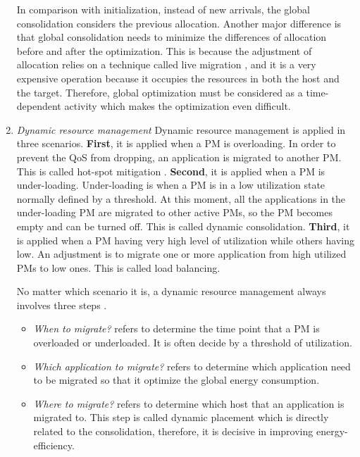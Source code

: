 \begin{enumerate}
	In comparison with initialization, instead of new arrivals, the global consolidation considers the previous allocation. Another major difference is that global consolidation needs to minimize the differences of allocation before and after the optimization. This is because the adjustment of allocation relies on a technique called live migration \cite{Clark:2005uda}, and it is a very expensive operation because it occupies the resources in both the host and the target. Therefore, global optimization must be considered as a time-dependent activity which makes the optimization even difficult.

	\item \emph{Dynamic resource management} 
 	Dynamic resource management is applied in three scenarios. \textbf{First},  it is applied when a PM is overloading. In order to prevent the QoS from dropping, an application is migrated to another PM. This is called hot-spot mitigation \cite{Mishra:2012kx}. \textbf{Second}, it is applied when a PM is under-loading. Under-loading is when a PM is in a low utilization state normally defined by a threshold. At this moment, all the applications in the under-loading PM are migrated to other active PMs, so the PM becomes empty and can be turned off. This is called dynamic consolidation. \textbf{Third}, it is applied when a PM having very high level of utilization while others having low. An adjustment is to migrate one or more application from high utilized PMs to low ones. This is called load balancing.

	No matter which scenario it is, a dynamic resource management always involves three steps . 
	\begin{itemize}
		\item \emph{When to migrate?} refers to determine the time point that a PM is overloaded or underloaded. It is often decide by a threshold of utilization.
		\item \emph{Which application to migrate?} refers to determine which application need to be migrated so that it optimize the global energy consumption.
		\item \emph{Where to migrate?} refers to determine which host that an application is migrated to. This step is called dynamic placement which is directly related to the consolidation, therefore, it is decisive in improving energy-efficiency. 
	\end{itemize}


\end{enumerate}
